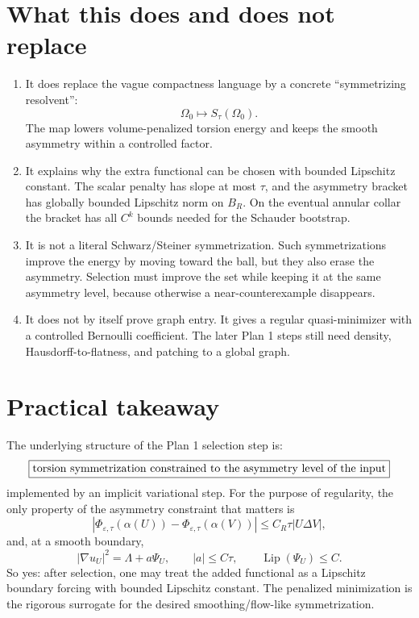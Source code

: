 \documentclass[11pt]{article}
\newcommand{\abs}[1]{\left|#1\right|}
\begin{document}
\section{What this does and does not replace}

\begin{enumerate}[label=\arabic*.]
\item It does replace the vague compactness language by a concrete
``symmetrizing resolvent'':
\[
   \Omega_0\mapsto S_\tau(\Omega_0).
\]
The map lowers volume-penalized torsion energy and keeps the smooth asymmetry
within a controlled factor.

\item It explains why the extra functional can be chosen with bounded
Lipschitz constant.  The scalar penalty has slope at most \(\tau\), and the
asymmetry bracket has globally bounded Lipschitz norm on \(B_R\).  On the
eventual annular collar the bracket has all \(C^k\) bounds needed for the
Schauder bootstrap.

\item It is not a literal Schwarz/Steiner symmetrization.  Such
symmetrizations improve the energy by moving toward the ball, but they also
erase the asymmetry.  Selection must improve the set while keeping it at the
same asymmetry level, because otherwise a near-counterexample disappears.

\item It does not by itself prove graph entry.  It gives a regular
quasi-minimizer with a controlled Bernoulli coefficient.  The later Plan 1
steps still need density, Hausdorff-to-flatness, and patching to a global
graph.
\end{enumerate}

\section{Practical takeaway}

The underlying structure of the Plan 1 selection step is:
\[
   \boxed{
   \hbox{torsion symmetrization constrained to the asymmetry level of the input}
   }
\]
implemented by an implicit variational step.  For the purpose of regularity,
the only property of the asymmetry constraint that matters is
\[
   \abs{\Phi_{\varepsilon,\tau}(\alpha(U))
       -\Phi_{\varepsilon,\tau}(\alpha(V))}
      \le C_R\tau\abs{U\Delta V},
\]
and, at a smooth boundary,
\[
   \abs{\nabla u_U}^2=\Lambda+a\Psi_U,
   \qquad
   \abs a\le C\tau,
   \qquad
   \operatorname{Lip}(\Psi_U)\le C.
\]
So yes: after selection, one may treat the added functional as a Lipschitz
boundary forcing with bounded Lipschitz constant.  The penalized minimization
is the rigorous surrogate for the desired smoothing/flow-like symmetrization.
\end{document}
